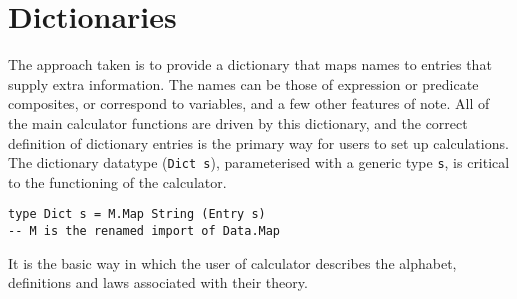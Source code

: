 \section{Dictionaries}\label{sec:Dictionaries}

The approach taken is to provide a dictionary that maps names
to entries that supply extra information.
The names can be those of expression or predicate composites,
or correspond to variables, and a few other features of note.
All of the main calculator functions are driven by this
dictionary,
and the correct definition of dictionary entries
is the primary way for users to set up calculations.
The dictionary datatype (\texttt{Dict s}),
parameterised with a generic type \texttt{s},
is critical to the functioning of the calculator.
\begin{verbatim}
type Dict s = M.Map String (Entry s)
-- M is the renamed import of Data.Map
\end{verbatim}
It is the basic way in which the user of calculator
describes the alphabet, definitions and laws associated with their theory.

